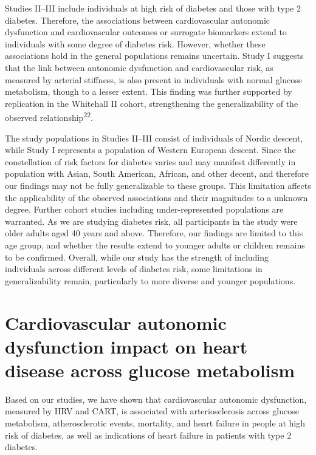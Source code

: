 \documentclass[
  a4paper,
  headsepline=true,
  open=any]{scrbook}
\begin{document}
Studies II--III include individuals at high risk of diabetes and those
with type 2 diabetes. Therefore, the associations between cardiovascular
autonomic dysfunction and cardiovascular outcomes or surrogate
biomarkers extend to individuals with some degree of diabetes risk.
However, whether these associations hold in the general populations
remains uncertain. Study I suggests that the link between autonomic
dysfunction and cardiovascular risk, as measured by arterial stiffness,
is also present in individuals with normal glucose metabolism, though to
a lesser extent. This finding was further supported by replication in
the Whitehall II cohort, strengthening the generalizability of the
observed relationship\textsuperscript{22}.

The study populations in Studies II--III consist of individuals of
Nordic descent, while Study I represents a population of Western
European descent. Since the constellation of risk factors for diabetes
varies and may manifest differently in population with Asian, South
American, African, and other decent, and therefore our findings may not
be fully generalizable to these groups. This limitation affects the
applicability of the observed associations and their magnitudes to a
unknown degree. Further cohort studies including under-represented
populations are warranted. As we are studying diabetes risk, all
participants in the study were older adults aged 40 years and above.
Therefore, our findings are limited to this age group, and whether the
results extend to younger adults or children remains to be confirmed.
Overall, while our study has the strength of including individuals
across different levels of diabetes risk, some limitations in
generalizability remain, particularly to more diverse and younger
populations.

\hypertarget{cardiovascular-autonomic-dysfunction-impact-on-heart-disease-across-glucose-metabolism}{%
\section{Cardiovascular autonomic dysfunction impact on heart disease
across glucose
metabolism}\label{cardiovascular-autonomic-dysfunction-impact-on-heart-disease-across-glucose-metabolism}}

Based on our studies, we have shown that cardiovascular autonomic
dysfunction, measured by HRV and CART, is associated with
arteriosclerosis across glucose metabolism, atherosclerotic events,
mortality, and heart failure in people at high risk of diabetes, as well
as indications of heart failure in patients with type 2 diabetes.
\end{document}
